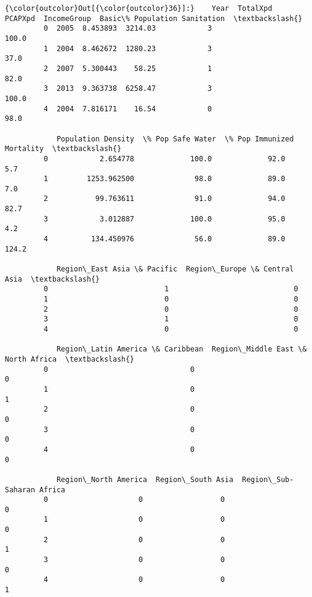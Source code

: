 \documentclass[11pt]{article}
\begin{document}
\begin{Verbatim}[commandchars=\\\{\}]
{\color{outcolor}Out[{\color{outcolor}36}]:}    Year  TotalXpd  PCAPXpd  IncomeGroup  Basic\% Population Sanitation  \textbackslash{}
         0  2005  8.453893  3214.03            3                         100.0   
         1  2004  8.462672  1280.23            3                          37.0   
         2  2007  5.300443    58.25            1                          82.0   
         3  2013  9.363738  6258.47            3                         100.0   
         4  2004  7.816171    16.54            0                          98.0   
         
            Population Density  \% Pop Safe Water  \% Pop Immunized  Mortality  \textbackslash{}
         0            2.654778             100.0             92.0        5.7   
         1         1253.962500              98.0             89.0        7.0   
         2           99.763611              91.0             94.0       82.7   
         3            3.012887             100.0             95.0        4.2   
         4          134.450976              56.0             89.0      124.2   
         
            Region\_East Asia \& Pacific  Region\_Europe \& Central Asia  \textbackslash{}
         0                           1                             0   
         1                           0                             0   
         2                           0                             0   
         3                           1                             0   
         4                           0                             0   
         
            Region\_Latin America \& Caribbean  Region\_Middle East \& North Africa  \textbackslash{}
         0                                 0                                  0   
         1                                 0                                  1   
         2                                 0                                  0   
         3                                 0                                  0   
         4                                 0                                  0   
         
            Region\_North America  Region\_South Asia  Region\_Sub-Saharan Africa  
         0                     0                  0                          0  
         1                     0                  0                          0  
         2                     0                  0                          1  
         3                     0                  0                          0  
         4                     0                  0                          1  
\end{Verbatim}
            
\end{document}
